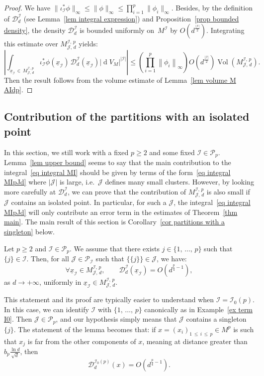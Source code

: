 \documentclass[AHL,Unicode,longabstracts,published]{cedram}
\DeclareMathOperator{\dmesure}{d}
\DeclareMathOperator{\Vol}{Vol}
\newcommand{\D}{\mathcal{D}}
\newcommand{\I}{\mathcal{I}}
\newcommand{\J}{\mathcal{J}}
\newcommand{\pa}{\mathcal{P}\!}
\newcommand{\norm}[1]{\left\lvert #1 \right\rvert}
\newcommand{\Norm}[1]{\left\lVert #1 \right\rVert}
\newcommand{\rmes}[1]{\norm{\dmesure\! V_{#1}}}
\newcommand{\vol}[1]{\Vol\!\left(#1\right)}
\renewcommand{\geq}{\geqslant}
\renewcommand{\leq}{\leqslant}
\let\oldforall\forall
\renewcommand*{\forall}{\mathrel{\oldforall}}
\begin{document}
\begin{proof}
We have $\|\iota_\I^*\phi\|_\infty \leq \|\phi\|_\infty \leq \prod_{i=1}^p \|\phi_i\|_\infty$. Besides, by the definition of $\D_d^\I$ (see Lemma~\ref{lem integral expression}) and Proposition~\ref{prop bounded density}, the density $\D_d^\I$ is bounded uniformly on~$M^\I$ by $O(d^\frac{|\I|}{2})$. Integrating this estimate over $M^{\I,\,p}_{\J,\,d}$ yields:
\[
\norm{\int_{\underline{x}_\I\,\in\,M^{\I,\,p}_{\J,\,d}} \iota_\I^*\phi\left(\underline{x}_\I\right) \, \D^\I_d\left(\underline{x}_\I\right) \rmes{M}^{\norm{\I}}} \leq \left(\prod_{i=1}^p \Norm{\phi_i}_\infty\right) O\left(d^{\frac{\norm{\I}}{2}}\right) \vol{M^{\I,\,p}_{\J,\,d}}.
\]
Then the result follows from the volume estimate of Lemma~\ref{lem volume M AIdp}.
\end{proof}



\subsection{Contribution of the partitions with an isolated point}\label{subsec contribution of the partitions with an isolated point}

In this section, we still work with a fixed $p \geq 2$ and some fixed $\I \in \pa_p$. Lemma~\ref{lem upper bound} seems to say that the main contribution to the integral~\eqref{eq integral MI} should be given by terms of the form~\eqref{eq integral MIpJd} where $|\J|$ is large, i.e.~$\J$ defines many small clusters. However, by looking more carefully at $\D_d^\I$, we can prove that the contribution of $M^{\I,\,p}_{\J,\,d}$ is also small if $\J$ contains an isolated point. In particular, for such a $\J$, the integral~\eqref{eq integral MIpJd} will only contribute an error term in the estimates of Theorem~\ref{thm main}. The main result of this section is Corollary~\ref{cor partitions with a singleton} below.

\begin{lemm}\label{lem partitions with a singleton}
Let $p \geq 2$ and $\I \in \pa_p$. We assume that there exists $j \in \{1,\,\dots,\,p\}$ such that $\{j\} \in \I$. Then, for all $\J \in \pa_\I$ such that $\{\{j\}\} \in \J$, we have:
\[
\forall \underline{x}_\I \in M^{\I,\,p}_{\J,\,d}, \qquad \D^\I_d(\underline{x}_\I) = O\left(d^{\frac{p}{4}-1}\right),
\]
as $d \to +\infty$, uniformly in $\underline{x}_\I \in M^{\I,\,p}_{\J,\,d}$.
\end{lemm}

\begin{rema}\label{rem partitions with a singletons}
This statement and its proof are typically easier to understand when $\I =\I_0(p)$. In this case, we can identify $\I$ with $\{1,\,\dots,\,p\}$ canonically as in Example~\ref{ex term I0}. Then $\J \in \pa_p$, and our hypothesis simply means that $\J$ contains a singleton $\{j\}$. The statement of the lemma becomes that: if $x=(x_i)_{1\,\leq\,i\,\leq\,p} \in M^p$ is such that $x_j$ is far from the other components of $x$, meaning at distance greater than $b_p \tfrac{\ln d}{\sqrt{d}}$, then
\[
\D_d^{\I_0(p)}(x) = O\left(d^{\frac{p}{4}-1}\right).
\]
\end{rema}
\end{document}
